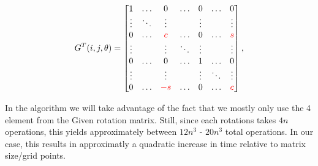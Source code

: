 \documentclass[a4paper]{article}
\begin{document}
\begin{equation}
  \label{eq:givens}
  G^{T}(i, j, \theta) = \begin{bmatrix}
    1 & \hdots & 0 &\hdots & 0 & \hdots & 0 \\
    \vdots & \ddots & \vdots & {} & \vdots & {} & \vdots \\
    0 & \hdots & \textcolor{red}c &\hdots & 0 & \hdots & \textcolor{red}s \\
    \vdots & {} & \vdots & \ddots & \vdots & {} & \vdots \\
    0 & \hdots & 0 &\hdots & 1 & \hdots & 0 \\
    \vdots & {} & \vdots & {} & \vdots & \ddots & \vdots \\
    0 & \hdots & \textcolor{red}-\textcolor{red}s &\hdots & 0 & \hdots & \textcolor{red}c \\
  \end{bmatrix},
\end{equation}





In the algorithm we will take advantage of the fact that we mostly only use the 4 element from the Given rotation matrix. Still, since each rotations takes $4n$ operations, this yields approximately between $12n^3$ - $20n^3$ total operations. In our case, this results in approximatly a quadratic increase in time relative to matrix size/grid points.
\end{document}
